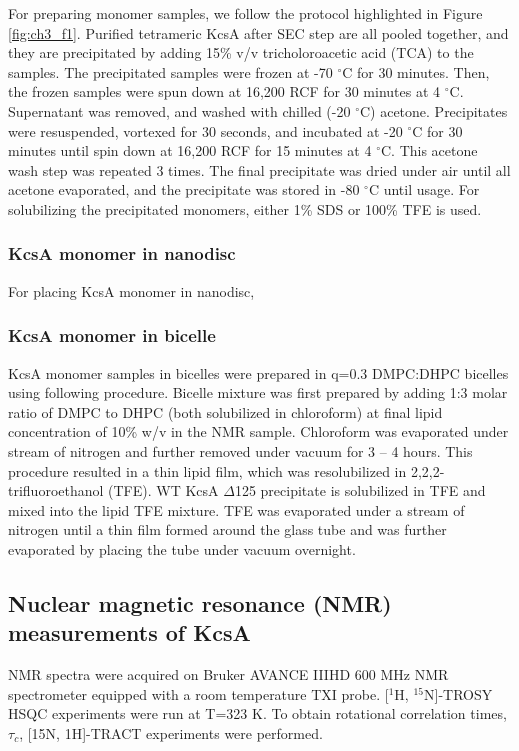 For preparing monomer samples, we follow the protocol highlighted in Figure \ref{fig:ch3_f1}. Purified tetrameric KcsA after SEC step are all pooled together, and they are precipitated by adding 15\% v/v tricholoroacetic acid (TCA) to the samples. The precipitated samples were frozen at -70 $^{\circ}$C for 30 minutes. Then, the frozen samples were spun down at 16,200 RCF for 30 minutes at 4 $^{\circ}$C. Supernatant was removed, and washed with chilled (-20 $^{\circ}$C) acetone. Precipitates were resuspended, vortexed for 30 seconds, and incubated at -20 $^{\circ}$C for 30 minutes until spin down at 16,200 RCF for 15 minutes at 4 $^{\circ}$C. This acetone wash step was repeated 3 times. The final precipitate was dried under air until all acetone evaporated, and the precipitate was stored in -80 $^{\circ}$C until usage. For solubilizing the precipitated monomers, either 1\% SDS or 100\% TFE is used.

\subsubsection{KcsA monomer in nanodisc}
For placing KcsA monomer in nanodisc, 

\subsubsection{KcsA monomer in bicelle}
KcsA monomer samples in bicelles were prepared in q=0.3 DMPC:DHPC bicelles using following procedure. Bicelle mixture was first prepared by adding 1:3 molar ratio of DMPC to DHPC (both solubilized in chloroform) at final lipid concentration of 10\% w/v in the NMR sample. Chloroform was evaporated under stream of nitrogen and further removed under vacuum for 3 – 4 hours. This procedure resulted in a thin lipid film, which was resolubilized in 2,2,2-trifluoroethanol (TFE). WT KcsA $\Delta$125 precipitate is solubilized in TFE and mixed into the lipid TFE mixture. TFE was evaporated under a stream of nitrogen until a thin film formed around the glass tube and was further evaporated by placing the tube under vacuum overnight. 

\subsection{Nuclear magnetic resonance (NMR) measurements of KcsA}
NMR spectra were acquired on Bruker AVANCE IIIHD 600 MHz NMR spectrometer equipped with a room temperature TXI probe. [$^{1}$H, $^{15}$N]-TROSY HSQC experiments were run at T=323 K. To obtain rotational correlation times, $\tau_{c}$, [15N, 1H]-TRACT experiments were performed. \citep{lee2006, cavanagh2007, cho1999, nesg2011, pond2012} 

